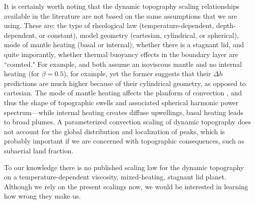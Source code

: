 It is certainly worth noting that the dynamic topography scaling relationships available in the literature are not based on the same assumptions that we are using. These are: the type of rheological law (temperature-dependent, depth-dependent, or constant), model geometry (cartesian, cylindrical, or spherical), mode of mantle heating (basal or internal), whether there is a stagnant lid, and quite imporantly, whether thermal buoyancy effects in the boundary layer are ``counted." For example,\citet{Kiefer1992} and \citet{Parsons1983} both assume an isoviscous mantle and no internal heating (for $\beta=0.5$), for example, yet the former suggests that their $\Delta h$ predictions are much higher because of their cylindrical geometry, as opposed to cartesian. The mode of mantle heating affects the planform of convection \citep[e.g.,][]{Choblet2009}, and thus the shape of topographic swells and associated spherical harmonic power spectrum---while internal heating creates diffuse upwellings, basal heating leads to broad plumes. A parameterized convection scaling of dynamic topography does not account for the global distribution and localization of peaks, which is probably important if we are concerned with topographic consequences, such as subaerial land fraction.

To our knowledge there is no published scaling law for the dynamic topography on a temperature-dependent viscosity, mixed-heating, stagnant lid planet. Although we rely on the present scalings now, we would be interested in learning how wrong they make us.


